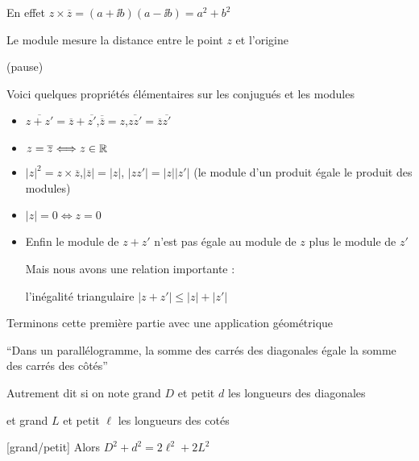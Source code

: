 \change

En effet $z \times \overline z = (a+\ii b)(a-\ii b) = a^2+b^2$

\change

Le module mesure la distance entre le point $z$ et l'origine

(pause)

\change


Voici quelques propriétés élémentaires sur les conjugués et les modules

\begin{itemize}
  \item $\overline{z + z'} = \overline{z} + \overline{z'}$,\quad $\overline{\overline{z}} =
  z$,\quad $\overline{zz'} = \overline{z}  \overline{z'}$
  
  \item $z = \overline{z} \Longleftrightarrow z \in \mathbb{R}$
  
  \item $\left| z \right|^2 = z \times \overline{z}$,\quad $\left| \overline{z} \right| =
  \left| z \right|$, \quad $\left| zz' \right| = \left| z \right|  \left| z'
  \right|$ (le module d'un produit égale le produit des modules)
  
  \item $\left| z \right| = 0 \Longleftrightarrow z = 0$
  
  \item 
Enfin le module de $z+z'$ n'est pas égale au module de $z$ plus le module de $z'$

Mais nous avons une relation importante : 

l'inégalité triangulaire  $\left| z + z' \right| \leqslant \left| z
  \right| + \left| z' \right|$
\end{itemize}


\diapo

Terminons cette première partie avec une application géométrique

``Dans un parallélogramme, la somme des carrés des diagonales égale la
  somme des carrés des c\^otés''



\change

Autrement dit si on note grand $D$ et petit $d$
les longueurs des diagonales

et grand $L$ et petit $\ell$ les longueurs des cotés

[grand/petit]
Alors $D^2+d^2 = 2\ell^2+2L^2$





